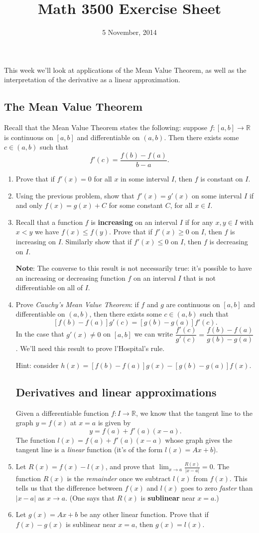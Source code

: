 \documentclass[letterpaper,12pt]{article}
\title{Math 3500 Exercise Sheet}
\date{5 November, 2014}
\newcommand{\R}{\mathbb{R}}
\newcommand{\abs}[1]{\lvert #1\rvert}
\begin{document}
\maketitle

This week we'll look at applications of the Mean Value Theorem, as well as the interpretation of the derivative as a linear approximation.
\subsection*{The Mean Value Theorem}
Recall that the Mean Value Theorem states the following: suppose $f:[a,b]\to \R$ is continuous on $[a,b]$ and differentiable on $(a,b)$. Then there exists some $c\in(a,b)$ such that
\[
 f'(c) = \frac{f(b)-f(a)}{b-a}.
\]

\begin{enumerate}
 \item Prove that if $f'(x)=0$ for all $x$ in some interval $I$, then $f$ is constant on $I$.
 \item Using the previous problem, show that $f'(x)=g'(x)$ on some interval $I$ if and only $f(x)=g(x)+C$ for some constant $C$, for all $x\in I$.
 \item Recall that a function $f$ is {\bf increasing} on an interval $I$ if for any $x,y\in I$ with $x<y$ we have $f(x)\leq f(y)$. Prove that if $f'(x)\geq 0$ on $I$, then $f$ is increasing on $I$. Similarly show that if $f'(x)\leq 0$ on $I$, then $f$ is decreasing on $I$.

{\bf Note}: The converse to this result is not necessarily true: it's possible to have an increasing or decreasing function $f$ on an interval $I$ that is not differentiable on all of $I$.
 \item Prove {\em Cauchy's Mean Value Theorem}: if $f$ and $g$ are continuous on $[a,b]$ and differentiable on $(a,b)$, then there exists some $c\in (a,b)$ such that
\[
 [f(b)-f(a)]g'(c) = [g(b)-g(a)]f'(c).
\]
In the case that $g'(x)\neq 0$ on $[a,b]$ we can write $\dfrac{f'(c)}{g'(c)} = \dfrac{f(b)-f(a)}{g(b)-g(a)}$. We'll need this result to prove l'Hospital's rule.

Hint: consider $h(x)=[f(b)-f(a)]g(x)-[g(b)-g(a)]f(x)$.

\subsection*{Derivatives and linear approximations}
Given a differentiable function $f:I\to \R$, we know that the tangent line to the graph $y=f(x)$ at $x=a$ is given by 
\[
 y = f(a) + f'(a)(x-a).
\]
The function $l(x)=f(a)+f'(a)(x-a)$ whose graph gives the tangent line is a {\em linear} function (it's of the form $l(x)=Ax+b$).
\item Let $R(x) = f(x)-l(x)$, and prove that $\displaystyle \lim_{x\to a}\frac{R(x)}{\abs{x-a}} = 0$. The function $R(x)$ is the {\em remainder} once we subtract $l(x)$ from $f(x)$. This tells us that the difference between $f(x)$ and $l(x)$ goes to zero {\em faster} than $\abs{x-a}$ as $x\to a$. (One says that $R(x)$ is {\bf sublinear} near $x=a$.)
\item Let $g(x)=Ax+b$ be any other linear function. Prove that if $f(x)-g(x)$ is sublinear near $x=a$, then $g(x)=l(x)$.


\end{enumerate}
\end{document}
